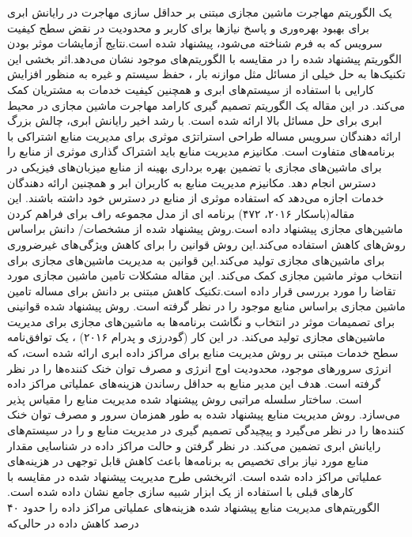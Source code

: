   یک الگوریتم مهاجرت ماشین مجازی مبتنی بر حداقل سازی مهاجرت در رایانش ابری برای بهبود بهره‌وری و پاسخ نیازها برای کاربر و محدودیت در نقض سطح کیفیت سرویس که به فرم 
    شناخته می‌شود، پیشنهاد شده است.نتایج آزمایشات موثر بودن الگوریتم پیشنهاد شده 
    را در مقایسه با الگوریتم‌های موجود نشان می‌دهد.اثر بخشی این تکنیک‌ها به حل خیلی از مسائل مثل موازنه بار ، حفظ سیستم  و غیره به منظور افزایش کارایی با استفاده از سیستم‌های ابری  و همچنین کیفیت خدمات به  مشتریان کمک می‌کند. در این مقاله یک الگوریتم تصمیم گیری کارامد مهاجرت ماشین مجازی در محیط ابری برای حل مسائل بالا ارائه شده است. 
     با رشد اخیر رایانش ابری، چالش بزرگ ارائه دهندگان سرویس مساله طراحی استراتژی موثری برای مدیریت منابع اشتراکی با برنامه‌های متفاوت است. مکانیزم مدیریت منابع باید اشتراک گذاری موثری از منابع را برای ماشین‌های مجازی با تضمین بهره برداری بهینه از منابع میزبان‌های فیزیکی در دسترس انجام دهد. مکانیزم مدیریت منابع به کاربران ابر و همچنین ارائه دهندگان خدمات اجازه می‌دهد که استفاده موثری از منابع در دسترس خود داشته باشند. این مقاله(باسکار ۲۰۱۶، ۴۷۲)
     برنامه ای از مدل مجموعه راف برای فراهم کردن ماشین‌های مجازی پیشنهاد داده است.روش پیشنهاد شده از مشخصات/ دانش براساس روش‌های کاهش استفاده می‌کند.این روش قوانین را برای کاهش ویژگی‌های غیرضروری برای ماشین‌های مجازی تولید می‌کند.این قوانین به مدیریت ماشین‌های مجازی برای انتخاب موثر ماشین مجازی کمک می‌کند. این مقاله مشکلات تامین ماشین مجازی مورد تقاضا را مورد بررسی قرار داده است.تکنیک کاهش مبتنی بر دانش برای مساله تامین ماشین مجازی براساس منابع موجود را در نظر گرفته است. روش پیشنهاد شده قوانینی برای تصمیمات موثر در انتخاب و نگاشت برنامه‌ها به ماشین‌های مجازی برای مدیریت ماشین‌های مجازی تولید می‌کند.
در این کار (گودرزی و پدرام ۲۰۱۶)
، 
یک توافق‌نامه سطح خدمات 
 مبتنی بر روش مدیریت منابع برای مراکز داده ابری ارائه شده است، که انرژی سرورهای موجود، محدودیت اوج انرژی و مصرف توان خنک کننده‌ها را در نظر گرفته است. هدف این مدیر منابع به حداقل رساندن هزینه‌های عملیاتی مراکز داده است. ساختار سلسله مراتبی روش پیشنهاد شده مدیریت منابع را مقیاس پذیر می‌سازد. روش مدیریت منابع پیشنهاد شده به طور همزمان سرور و مصرف توان خنک کننده‌ها را در نظر می‌گیرد و پیچیدگی تصمیم گیری در مدیریت منابع و
   را در سیستم‌های رایانش ابری تضمین می‌کند. در نظر گرفتن
    و حالت مراکز داده در شناسایی مقدار منابع مورد نیاز برای تخصیص به برنامه‌ها باعث کاهش قابل توجهی در هزینه‌های عملیاتی مراکز داده شده است. اثربخشی طرح مدیریت پیشنهاد شده در مقایسه با کارهای قبلی با استفاده از یک ابزار شبیه سازی جامع نشان داده شده است. الگوریتم‌های مدیریت منابع پیشنهاد شده هزینه‌های عملیاتی مراکز داده را حدود ۴۰ درصد کاهش داده در حالی‌که
